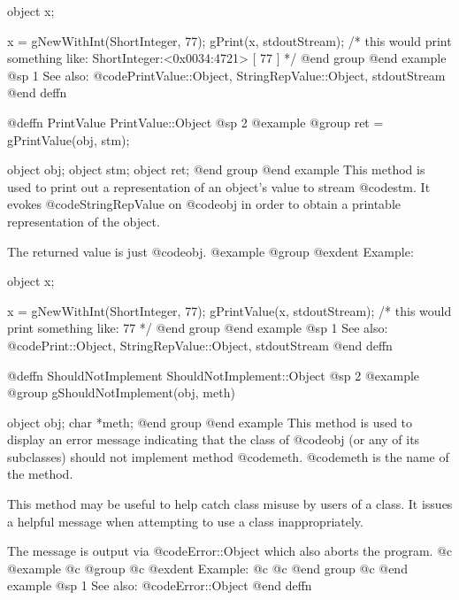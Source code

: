 object  x;

x = gNewWithInt(ShortInteger, 77);
gPrint(x, stdoutStream);
/* this would print something like:  
      ShortInteger:<0x0034:4721> [ 77 ] */
@end group
@end example
@sp 1
See also:  @code{PrintValue::Object, StringRepValue::Object, stdoutStream}
@end deffn










@deffn {PrintValue} PrintValue::Object
@sp 2
@example
@group
ret = gPrintValue(obj, stm);

object  obj;
object  stm;
object  ret;
@end group
@end example
This method is used to print out a representation of an object's
value to stream @code{stm}.  It evokes @code{StringRepValue}
on @code{obj} in order to obtain a printable representation of
the object.

The returned value is just @code{obj}.
@example
@group
@exdent Example:

object  x;

x = gNewWithInt(ShortInteger, 77);
gPrintValue(x, stdoutStream);
/* this would print something like:  77  */
@end group
@end example
@sp 1
See also:  @code{Print::Object, StringRepValue::Object, stdoutStream}
@end deffn










@deffn {ShouldNotImplement} ShouldNotImplement::Object
@sp 2
@example
@group
gShouldNotImplement(obj, meth)

object  obj;
char    *meth;
@end group
@end example
This method is used to display an error message indicating that the
class of @code{obj} (or any of its subclasses) should not implement
method @code{meth}.  @code{meth} is the name of the method.

This method may be useful to help catch class misuse by users of a
class.  It issues a helpful message when attempting to use a class
inappropriately.

The message is output via @code{Error::Object} which also aborts the
program.
@c @example
@c @group
@c @exdent Example:
@c 
@c @end group
@c @end example
@sp 1
See also:  @code{Error::Object}
@end deffn
















